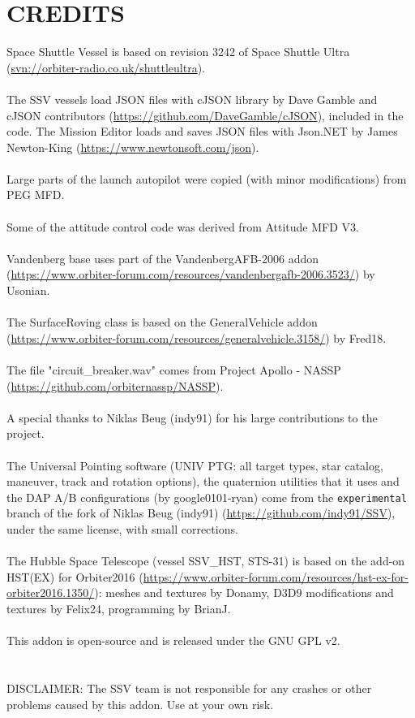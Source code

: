 \documentclass[Space_Shuttle_Vessel_Manual.tex]{subfiles}
\begin{document}
\section{CREDITS}
Space Shuttle Vessel is based on revision 3242 of Space Shuttle Ultra (\url{svn://orbiter-radio.co.uk/shuttleultra}).\\
\\
The SSV vessels load JSON files with cJSON library by Dave Gamble and cJSON contributors (\url{https://github.com/DaveGamble/cJSON}), included in the code. The Mission Editor loads and saves JSON files with Json.NET by James Newton-King (\url{https://www.newtonsoft.com/json}).\\
\\
Large parts of the launch autopilot were copied (with minor modifications) from PEG MFD.\\
\\
Some of the attitude control code was derived from Attitude MFD V3.\\
\\
Vandenberg base uses part of the VandenbergAFB-2006 addon (\url{https://www.orbiter-forum.com/resources/vandenbergafb-2006.3523/}) by Usonian.\\
\\
The SurfaceRoving class is based on the GeneralVehicle addon (\url{https://www.orbiter-forum.com/resources/generalvehicle.3158/}) by Fred18.\\
\\
The file "circuit\_breaker.wav" comes from Project Apollo - NASSP (\url{https://github.com/orbiternassp/NASSP}).\\
\\
A special thanks to Niklas Beug (indy91) for his large contributions to the project.\\
\\
The Universal Pointing software (UNIV PTG: all target types, star catalog, maneuver, track and rotation options), the quaternion utilities that it uses and the DAP A/B configurations (by google0101-ryan) come from the \texttt{experimental} branch of the fork of Niklas Beug (indy91) (\url{https://github.com/indy91/SSV}), under the same license, with small corrections.\\
\\
The Hubble Space Telescope (vessel SSV\_HST, STS-31) is based on the add-on HST(EX) for Orbiter2016 (\url{https://www.orbiter-forum.com/resources/hst-ex-for-orbiter2016.1350/}): meshes and textures by Donamy, D3D9 modifications and textures by Felix24, programming by BrianJ.\\
\\
This addon is open-source and is released under the GNU GPL v2.\\
\\
\\
DISCLAIMER: The SSV team is not responsible for any crashes or other problems caused by this addon. Use at your own risk.
\end{document}
